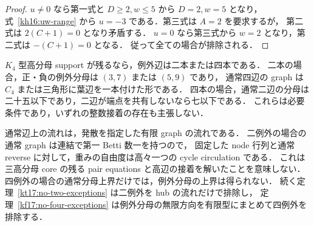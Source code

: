 \begin{proof}
$u\ne0$ なら第一式と $D\geq2,w\leq5$ から $D=2,w=5$ となり，
式~\eqref{kh16:uw-range} から $u=-3$ である．第三式は $A=2$ を要求するが，
第二式は $2(C+1)=0$ となり矛盾する．
$u=0$ なら第三式から $w=2$ となり，第二式は $-(C+1)=0$ となる．
従って全ての場合が排除される．
\end{proof}

\begin{corollary}[$K_4$ の接着に対する中間の二場合]
\label{kh16:remaining-cases}
$K_4$ 型高分母 support が残るなら，例外辺は二本または四本である．
二本の場合，正・負の例外分母は $(3,7)$ または $(5,9)$ であり，
通常四辺の graph は $C_4$ または三角形に葉辺を一本付けた形である．
四本の場合，通常二辺の分母は二十五以下であり，二辺が端点を共有しないなら七以下である．
これらは必要条件であり，いずれの整数接着の存在も主張しない．
\end{corollary}

\begin{remark}[有限化の前に残る自由度]
通常辺上の流れは，発散を指定した有限 graph の流れである．
二例外の場合の通常 graph は連結で第一 Betti 数一を持つので，
固定した node 行列と通常 reverse に対して，重みの自由度は高々一つの cycle circulation である．
これは三高分母 core の残る pair equations と高辺の接着を解いたことを意味しない．
四例外の場合の通常分母上界だけでは，例外分母の上界は得られない．
続く定理~\ref{kt17:no-two-exceptions} は二例外を hub の流れだけで排除し，
定理~\ref{kf17:no-four-exceptions} は例外分母の無限方向を有限型にまとめて四例外を排除する．
\end{remark}
